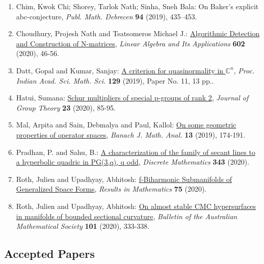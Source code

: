 \begin{enumerate}
\item Chim, Kwok Chi; Shorey, Tarlok Nath; Sinha, Sneh Bala: On Baker's explicit abc-conjecture, \emph{Publ. Math. Debrecen} {\bf 94} (2019), 435–453.
\item Choudhury, Projesh Nath and Tsatsomeros Michael J.: \href{https://doi.org/10.1016/j.laa.2020.04.028}{Algorithmic Detection and Construction of N-matrices}, \emph{Linear Algebra and Its Applications} {\bf 602} (2020), 46-56.
\item Datt, Gopal and Kumar, Sanjay: \href{https://link.springer.com/article/10.1007/s12044-018-0449-5?shared-article-renderer}{A criterion for quasinormality in $\mathbb{C}^n$}, \emph{Proc. Indian Acad. Sci. Math. Sci.} {\bf 129} (2019), Paper No. 11, 13 pp..
\item Hatui, Sumana: \href{https://www.degruyter.com/view/journals/jgth/23/1/article-p85.xml}{Schur multipliers of special p-groups of rank 2}, \emph{Journal of Group Theory} {\bf 23} (2020), 85-95.
\item Mal, Arpita and Sain, Debmalya and Paul, Kallol: \href{https://projecteuclid.org/euclid.bjma/1543914019}{On some geometric properties of operator spaces}, \emph{Banach J. Math. Anal.} {\bf 13} (2019), 174-191.
\item Pradhan, P. and Sahu, B.: \href{https://doi.org/10.1016/j.disc.2020.112044}{A characterization of the family of secant lines to a hyperbolic quadric in PG(3,q), q odd}, \emph{Discrete Mathematics} {\bf 343} (2020).
\item Roth, Julien and Upadhyay, Abhitosh: \href{https://link.springer.com/article/10.1007/s00025-019-1142-4?shared-article-renderer#citeas}{f-Biharmonic Submanifolds of Generalized Space Forms}, \emph{Results in Mathematics} {\bf 75} (2020).
\item Roth, Julien and Upadhyay, Abhitosh: \href{https://www.cambridge.org/core/journals/bulletin-of-the-australian-mathematical-society/article/on-almost-stable-cmc-hypersurfaces-in-manifolds-of-bounded-sectional-curvature/E0BF84D4D46C82F6D75CDCEAAF5DEE94}{On almost stable CMC hypersurfaces in manifolds of bounded sectional curvature}, \emph{Bulletin of the Australian Mathematical Society} {\bf 101} (2020), 333-338.
\end{enumerate}


\subsection{Accepted Papers}

